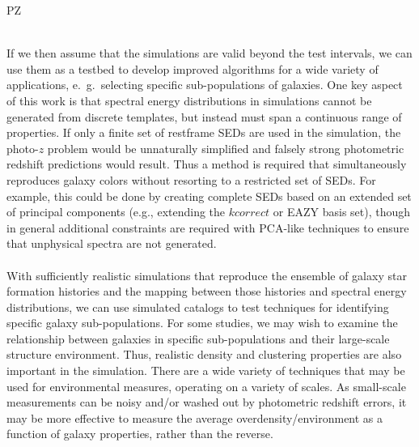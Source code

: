 {\begin{tasklist}{PZ}
\begin{task}
{~\\
If we then assume that the simulations are valid beyond the test intervals, we can use them as a testbed to develop improved algorithms for a wide variety of applications, e.~g.~selecting specific sub-populations of galaxies.  
One key aspect of this work is that spectral energy distributions in simulations cannot be generated from discrete templates, but instead must span a continuous range of properties. If only a finite set of restframe SEDs are used in the simulation, the photo-$z$ problem would be unnaturally simplified and  falsely strong photometric redshift predictions would result. Thus a method is required that simultaneously reproduces galaxy colors without resorting to a restricted set of SEDs. For example, this could be done by creating complete SEDs based  on an extended set of principal components (e.g., extending the $kcorrect$ or EAZY basis set), though in general additional constraints are required with PCA-like techniques to ensure that unphysical spectra are not generated.\\
~\\
With sufficiently realistic simulations that reproduce the ensemble of galaxy star formation histories and the mapping between those histories and spectral energy distributions, we can use simulated catalogs to test techniques for identifying specific galaxy sub-populations.  For some studies, we may wish to examine the relationship between galaxies in specific sub-populations and their large-scale structure environment.  Thus, realistic density and clustering properties are also important in the simulation.  There are a wide variety of techniques that may be used for environmental measures, operating on a variety of scales. As small-scale measurements can be noisy and/or washed out by photometric redshift errors, it may be more effective to measure the average overdensity/environment as a function of galaxy properties, rather than the reverse.\\
~\\
}
~\\
\end{task}
\end{tasklist}}
